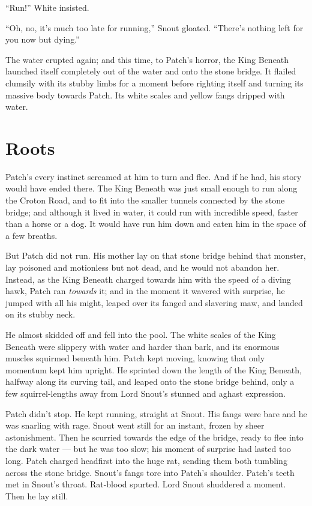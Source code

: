 \documentclass[ebook,oneside,openany,17pt]{memoir}
\renewcommand{\thechapter}{\Roman{chapter}}
\newcounter{sections}
\newcommand{\sections}[1]{%
  \section*{#1}
  \addtocounter{sections}{1}%
  \pdfbookmark[1]{#1}{section.\thechapter.\thesections}}
\begin{document}
“Run!” White insisted.

“Oh, no, it’s much too late for running,” Snout gloated. “There’s
nothing left for you now but dying.”

The water erupted again; and this time, to Patch’s horror, the King
Beneath launched itself completely out of the water and onto the stone
bridge. It flailed clumsily with its stubby limbs for a moment before
righting itself and turning its massive body towards Patch. Its white
scales and yellow fangs dripped with water.


\sections{Roots}

Patch’s every instinct screamed at him to turn and flee. And if he
had, his story would have ended there. The King Beneath was just small
enough to run along the Croton Road, and to fit into the smaller
tunnels connected by the stone bridge; and although it lived in water,
it could run with incredible speed, faster than a horse or a dog. It
would have run him down and eaten him in the space of a few breaths.

But Patch did not run. His mother lay on that stone bridge behind that
monster, lay poisoned and motionless but not dead, and he would not
abandon her. Instead, as the King Beneath charged towards him with the
speed of a diving hawk, Patch ran \emph{towards} it; and in the
moment it wavered with surprise, he jumped with all his might, leaped
over its fanged and slavering maw, and landed on its stubby neck.

He almost skidded off and fell into the pool. The white scales of the
King Beneath were slippery with water and harder than bark, and its
enormous muscles squirmed beneath him. Patch kept moving, knowing that
only momentum kept him upright. He sprinted down the length of the
King Beneath, halfway along its curving tail, and leaped onto the
stone bridge behind, only a few squirrel-lengths away from Lord
Snout’s stunned and aghast expression.

Patch didn’t stop. He kept running, straight at Snout. His fangs were
bare and he was snarling with rage. Snout went still for an instant,
frozen by sheer astonishment. Then he scurried towards the edge of the
bridge, ready to flee into the dark water — but he was too slow; his
moment of surprise had lasted too long. Patch charged headfirst into
the huge rat, sending them both tumbling across the stone
bridge. Snout’s fangs tore into Patch’s shoulder. Patch’s teeth met in
Snout’s throat. Rat-blood spurted. Lord Snout shuddered a moment. Then
he lay still.
\end{document}
